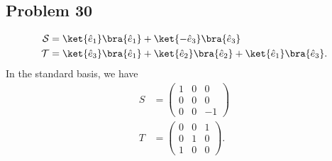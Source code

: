 \documentclass[10pt]{mypackage}
\begin{document}
\subsection{Problem 30}%
\begin{align*}
  \mathcal{S} &= \ket{\hat{e}_1}\bra{\hat{e}_1} + \ket{-\hat{e}_3}\bra{\hat{e}_3}\\
  \mathcal{T} &= \ket{\hat{e}_3}\bra{\hat{e}_1} + \ket{\hat{e}_2}\bra{\hat{e}_2} + \ket{\hat{e}_1}\bra{\hat{e}_3}.
\end{align*}
In the standard basis, we have
\begin{align*}
  S &= \begin{pmatrix}1 & 0 & 0 \\ 0 & 0 & 0 \\ 0 & 0 & -1\end{pmatrix}\\
  T &= \begin{pmatrix}0 & 0 & 1 \\ 0 & 1 & 0 \\ 1 & 0 & 0\end{pmatrix}.
\end{align*}
\end{document}
